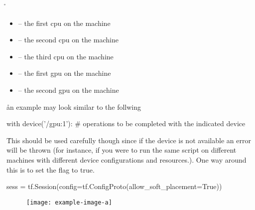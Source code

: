 \r{\begin{itemize}
		\item {} -- the first cpu on the machine
		\item {} -- the second cpu on the machine
		\item {} -- the third cpu on the machine
		\item {} -- the first gpu on the machine
		\item {} -- the second gpu on the machine
\end{itemize}}

\r{an example may look similar to the follwing}

\begin{python}
with device('/gpu:1'):
	# operations to be completed with the indicated device
\end{python}

\r{This should be used carefully though since if the device is not available an error will be thrown (for instance, if you were to run the same script on different machines with different device configurations and resources.).  One way around this is to set the  flag to true.}

\begin{python}
sess = tf.Session(config=tf.ConfigProto(allow_soft_placement=True))
\end{python}



\begin{figure}[htp]
	\centering
	\texttt{[image: example-image-a]}\hfil
	\caption{}
	\label{fig:tf_api_distributed_multidevice_example}
\end{figure}



